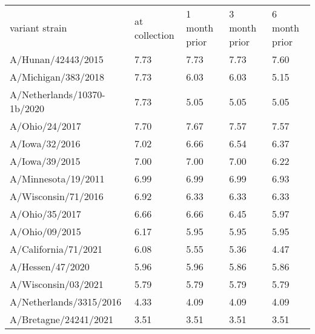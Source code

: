 \begin{tabular}{L{1.95in}|L{.6in}|L{.60in}|L{.6in}|C{.6in}}\hline
 variant  strain & at  collection & 1  month  prior & 3  month  prior & 6  month  prior \\
A/Hunan/42443/2015&7.73&7.73&7.73&7.60\\
A/Michigan/383/2018&7.73&6.03&6.03&5.15\\
A/Netherlands/10370-1b/2020&7.73&5.05&5.05&5.05\\
A/Ohio/24/2017&7.70&7.67&7.57&7.57\\
A/Iowa/32/2016&7.02&6.66&6.54&6.37\\
A/Iowa/39/2015&7.00&7.00&7.00&6.22\\
A/Minnesota/19/2011&6.99&6.99&6.99&6.93\\
A/Wisconsin/71/2016&6.92&6.33&6.33&6.33\\
A/Ohio/35/2017&6.66&6.66&6.45&5.97\\
A/Ohio/09/2015&6.17&5.95&5.95&5.95\\
A/California/71/2021&6.08&5.55&5.36&4.47\\
A/Hessen/47/2020&5.96&5.96&5.86&5.86\\
A/Wisconsin/03/2021&5.79&5.79&5.79&5.79\\
A/Netherlands/3315/2016&4.33&4.09&4.09&4.09\\
A/Bretagne/24241/2021&3.51&3.51&3.51&3.51\\
\hline\end{tabular}
